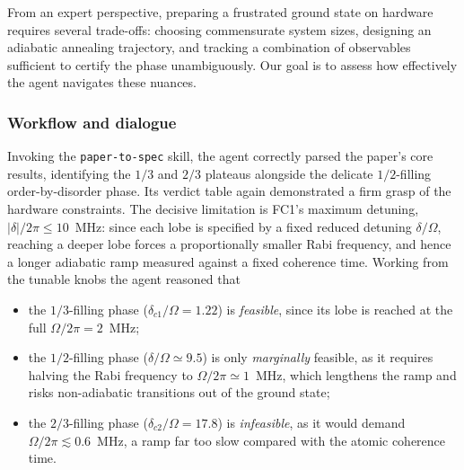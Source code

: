 \documentclass[aps,pra,reprint,amssymb,superscriptaddress,nofootinbib,floatfix]{revtex4-2}
\begin{document}
From an expert perspective, preparing a frustrated ground state on hardware requires
several trade-offs: choosing commensurate system sizes, designing an adiabatic
annealing trajectory, and tracking a combination of observables sufficient to certify
the phase unambiguously. Our goal is to assess how effectively the agent navigates
these nuances.

\subsubsection{Workflow and dialogue}

Invoking the \texttt{paper-to-spec} skill, the agent correctly parsed the paper's core
results, identifying the $1/3$ and $2/3$ plateaus alongside the delicate $1/2$-filling
order-by-disorder phase. Its verdict table again demonstrated a firm grasp of the
hardware constraints. The decisive limitation is FC1's maximum detuning,
$|\delta|/2\pi \le 10$~MHz: since each lobe is specified by a fixed reduced detuning
$\delta/\Omega$, reaching a deeper lobe forces a proportionally smaller Rabi
frequency, and hence a longer adiabatic ramp measured against a fixed coherence time.
Working from the tunable knobs the agent reasoned that

\begin{itemize}
    \item[\textit{(i)}] the $1/3$-filling phase ($\delta_{c1}/\Omega = 1.22$) is
    \emph{feasible}, since its lobe is reached at the full
    $\Omega/2\pi = 2$~MHz;
    \item[\textit{(ii)}] the $1/2$-filling phase ($\delta/\Omega \simeq 9.5$) is only
    \emph{marginally} feasible, as it requires halving the Rabi frequency to
    $\Omega/2\pi \simeq 1$~MHz, which lengthens the ramp and risks non-adiabatic
    transitions out of the ground state;
    \item[\textit{(iii)}] the $2/3$-filling phase ($\delta_{c2}/\Omega = 17.8$) is
    \emph{infeasible}, as it would demand $\Omega/2\pi \lesssim 0.6$~MHz, a ramp far
    too slow compared with the atomic coherence time.
\end{itemize}
\end{document}
